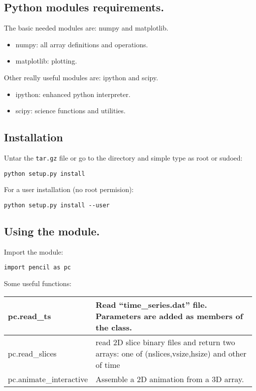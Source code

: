 \documentclass[a4paper,12pt]{article}
\begin{document}
\subsection{Python modules requirements.}
The basic needed modules are: numpy and matplotlib.
\begin{itemize}
 \item numpy: all array definitions and operations.
  \item matplotlib: plotting.
\end{itemize}

Other really useful modules are: ipython and scipy.

\begin{itemize}
 \item ipython: enhanced python interpreter.
  \item scipy: science functions and utilities.
\end{itemize}


\subsection{Installation}
Untar the \texttt{tar.gz} file or go to the directory and simple type as root or sudoed:
\begin{verbatim}
python setup.py install
\end{verbatim}
For a user installation (no root permision):
\begin{verbatim}
python setup.py install --user
\end{verbatim}

\subsection{Using the module.}
Import the module:
\begin{verbatim}
import pencil as pc
\end{verbatim}
Some useful functions:
\begin{center}
\begin{tabular}{|l|l|}\hline
pc.read\_ts & Read ``time\_series.dat'' file. Parameters are added as members of the class. \\\hline
pc.read\_slices & read 2D slice binary files and return two arrays: one of (nslices,vsize,hsize) and other of time\\\hline
pc.animate\_interactive &  Assemble a 2D animation from a 3D array. \\\hline
\end{tabular}
\end{center}

\end{document}
